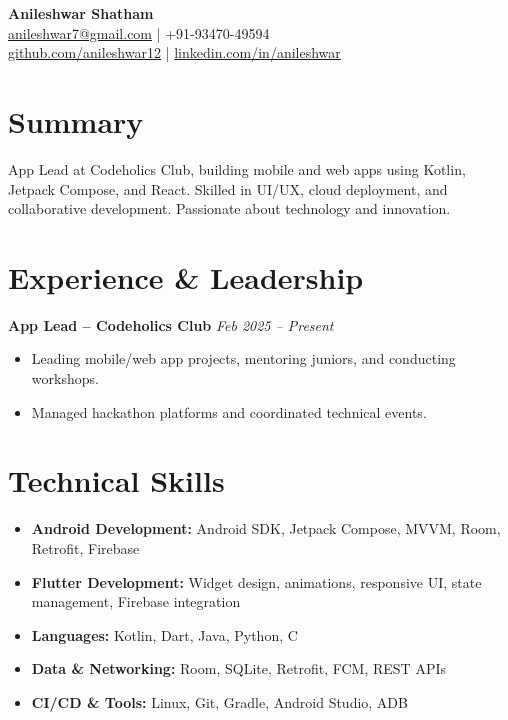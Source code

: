 \documentclass[a4paper,10pt]{article}
\begin{document}
\begin{center}
    {\LARGE \textbf{Anileshwar Shatham}} \\
    \href{mailto:anileshwar7@gmail.com}{anileshwar7@gmail.com} \quad | \quad +91-93470-49594 \\
    \href{https://github.com/anileshwar12}{github.com/anileshwar12} \quad | \quad
    \href{https://www.linkedin.com/in/anileshwar/}{linkedin.com/in/anileshwar} \\
\end{center}

\vspace{-0.8em}

\section*{Summary}
App Lead at Codeholics Club, building mobile and web apps using Kotlin, Jetpack Compose, and React. Skilled in UI/UX, cloud deployment, and collaborative development. Passionate about technology and innovation.

\section*{Experience \& Leadership}

\textbf{App Lead – Codeholics Club} \hfill \textit{Feb 2025 – Present} \\
\begin{itemize}[leftmargin=*, itemsep=0pt]
\item Leading mobile/web app projects, mentoring juniors, and conducting workshops.
\item Managed hackathon platforms and coordinated technical events.
\end{itemize}

\section*{Technical Skills}

\begin{multicols}{2}
\begin{itemize}[leftmargin=*, itemsep=1pt]
    \item \textbf{Android Development:} Android SDK, Jetpack Compose, MVVM, Room, Retrofit, Firebase
    \item \textbf{Flutter Development:} Widget design, animations, responsive UI, state management, Firebase integration
    \item \textbf{Languages:} Kotlin, Dart, Java, Python, C
    \item \textbf{Data \& Networking:} Room, SQLite, Retrofit, FCM, REST APIs
    \item \textbf{CI/CD \& Tools:} Linux, Git, Gradle, Android Studio, ADB
\end{itemize}
\end{multicols}
\end{document}
